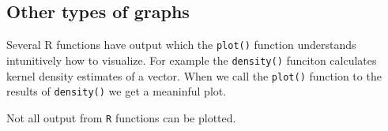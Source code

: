 \documentclass[
]{article}
\newenvironment{Shaded}{\begin{snugshade}}{\end{snugshade}}
\newcommand{\CommentTok}[1]{\textcolor[rgb]{0.56,0.35,0.01}{\textit{#1}}}
\newcommand{\DataTypeTok}[1]{\textcolor[rgb]{0.13,0.29,0.53}{#1}}
\newcommand{\KeywordTok}[1]{\textcolor[rgb]{0.13,0.29,0.53}{\textbf{#1}}}
\newcommand{\NormalTok}[1]{#1}
\newcommand{\OperatorTok}[1]{\textcolor[rgb]{0.81,0.36,0.00}{\textbf{#1}}}
\newcommand{\StringTok}[1]{\textcolor[rgb]{0.31,0.60,0.02}{#1}}
\begin{document}
\hypertarget{other-types-of-graphs}{%
\subsection{Other types of graphs}\label{other-types-of-graphs}}

Several R functions have output which the \texttt{plot()} function
understands intunitively how to visualize. For example the
\texttt{density()} funciton calculates kernel density estimates of a
vector. When we call the \texttt{plot()} function to the results of
\texttt{density()} we get a meaninful plot.

Not all output from \texttt{R} functions can be plotted.

\begin{Shaded}
\end{Shaded}
\end{document}
